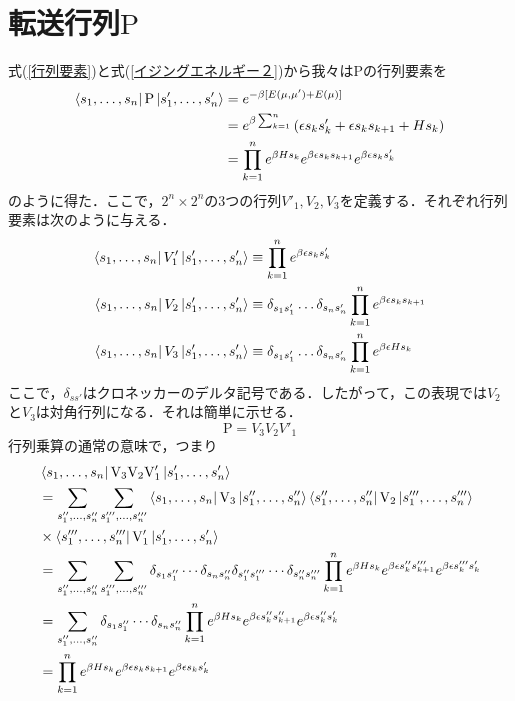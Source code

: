 \documentclass[a4paper,11pt]{jsreport}
\begin{document}
\section{転送行列$\mathrm{P}$}
式(\ref{行列要素})と式(\ref{イジングエネルギー２})から我々は$\mathrm{P}$の行列要素を
\begin{align}
  \bra{s_1,\dots,s_n}\mathrm{P}\ket{s'_1,\dots,s'_n}
   & = e^{-\beta[E(\mu, \mu') + E(\mu)]} \notag                                                        \\
   & = e^{\beta \sum_{k=1}^{n}} \left( \epsilon s_k s'_k + \epsilon s_k s_{k+1} + H s_k \right) \notag \\
   & = \prod_{k=1}^n e^{\beta H s_k} e^{\beta \epsilon s_k s_{k+1}} e^{\beta \epsilon s_k s'_k}
\end{align}
のように得た．ここで，$2^n \times 2^n$の3つの行列$V'_1, V_2, V_3$を定義する．それぞれ行列要素は次のように与える．
\begin{align}
  \bra{s_1,\dots,s_n}V'_1\ket{s'_1,\dots,s'_n}
   & \equiv \prod_{k=1}^n e^{\beta \epsilon s_k s'_k} \label{V1'}                                 \\
  \bra{s_1,\dots,s_n}V_2\ket{s'_1,\dots,s'_n}
   & \equiv \delta_{s_1 s'_1}\dots\delta_{s_n s'_n} \prod_{k=1}^n e^{\beta \epsilon s_k s_{k+1}} \\
  \bra{s_1,\dots,s_n}V_3\ket{s'_1,\dots,s'_n}
   & \equiv \delta_{s_1 s'_1}\dots\delta_{s_n s'_n} \prod_{k=1}^n e^{\beta \epsilon H s_k}       \\
\end{align}
ここで，$\delta_{ss'}$はクロネッカーのデルタ記号である．したがって，この表現では$V_2$と$V_3$は対角行列になる．それは簡単に示せる．
\begin{equation}
  \mathrm{P} = V_3 V_2 V'_1
  \label{転送行列}
\end{equation}
行列乗算の通常の意味で，つまり
\begin{align*}
  & \bra{s_1,\dots,s_n}\mathrm{V}_3\mathrm{V}_2\mathrm{V}'_1\ket{s'_1,\dots,s'_n}                                                            \\
  & = \sum_{s''_1, \dots, s''_n} \sum_{s'''_1, \dots, s'''_n} \bra{s_1,\dots,s_n}\mathrm{V}_3\ket{s''_1,\dots,s''_n} \bra{s''_1,\dots,s''_n}\mathrm{V}_2\ket{s'''_1,\dots,s'''_n}       \\
  & \times \bra{s'''_1,\dots,s'''_n}\mathrm{V}'_1\ket{s'_1,\dots,s'_n} \\
  & = \sum_{s''_1, \dots, s''_n} \sum_{s'''_1, \dots, s'''_n}
  \delta_{s_1s''_1} \cdots \delta_{s_ns''_n} \delta_{s''_1s'''_1} \cdots \delta_{s''_ns'''_n} \prod_{k =1}^{n} e^{\beta H s_k} e^{\beta \epsilon s''_k s'''_{k+1}} e^{\beta \epsilon s'''_k s'_k} \\
  & = \sum_{s''_1, \dots, s''_n} 
  \delta_{s_1s''_1} \cdots \delta_{s_ns''_n} \prod_{k =1}^{n} e^{\beta H s_k} e^{\beta \epsilon s''_k s''_{k+1}} e^{\beta \epsilon s''_k s'_k} \\
  & = \prod_{k =1}^{n} e^{\beta H s_k} e^{\beta \epsilon s_k s_{k+1}} e^{\beta \epsilon s_k s'_k}
\end{align*}
\end{document}
